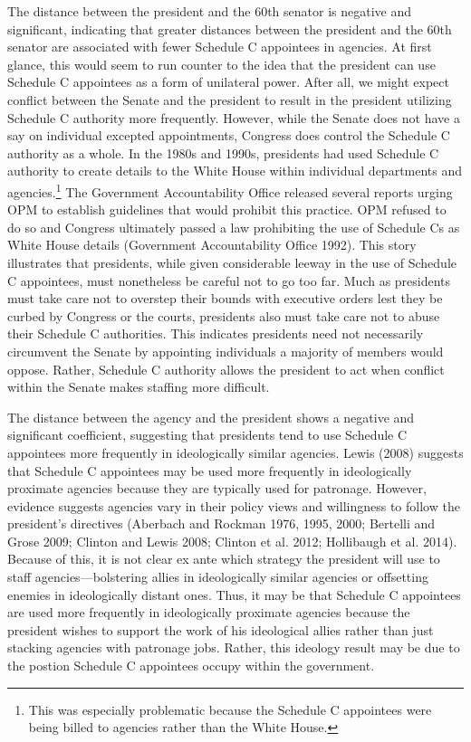 \documentclass[12pt]{article}
\begin{document}
The distance between the president and the 60th senator is negative and significant, indicating that greater distances between the president and the 60th senator are associated with fewer Schedule C appointees in agencies. At first glance, this would seem to run counter to the idea that the president can use Schedule C appointees as a form of unilateral power. After all, we might expect conflict between the Senate and the president to result in the president utilizing Schedule C authority more frequently. However, while the Senate does not have a say on individual excepted appointments, Congress does control the Schedule C authority as a whole. In the 1980s and 1990s, presidents had used Schedule C authority to create details to the White House within individual departments and agencies.\footnote{This was especially problematic because the Schedule C appointees were being billed to agencies rather than the White House.} The Government Accountability Office released several reports urging OPM to establish guidelines that would prohibit this practice. OPM refused to do so and Congress ultimately passed a law prohibiting the use of Schedule Cs as White House details (Government Accountability Office 1992). This story illustrates that presidents, while given considerable leeway in the use of Schedule C appointees, must nonetheless be careful not to go too far. Much as presidents must take care not to overstep their bounds with executive orders lest they be curbed by Congress or the courts, presidents also must take care not to abuse their Schedule C authorities. This indicates presidents need not necessarily circumvent the Senate by appointing individuals a majority of members would oppose. Rather, Schedule C authority allows the president to act when conflict within the Senate makes staffing more difficult.

The distance between the agency and the president shows a negative and significant coefficient, suggesting that presidents tend to use Schedule C appointees more frequently in ideologically similar agencies. Lewis (2008) suggests that Schedule C appointees may be used more frequently in ideologically proximate agencies because they are typically used for patronage. However, evidence suggests agencies vary in their policy views and willingness to follow the president's directives (Aberbach and Rockman 1976, 1995, 2000; Bertelli and Grose 2009; Clinton and Lewis 2008; Clinton et al. 2012; Hollibaugh et al. 2014). Because of this, it is not clear ex ante which strategy the president will use to staff agencies---bolstering allies in ideologically similar agencies or offsetting enemies in ideologically distant ones. Thus, it may be that Schedule C appointees are used more frequently in ideologically proximate agencies because the president wishes to support the work of his ideological allies rather than just stacking agencies with patronage jobs. Rather, this ideology result may be due to the postion Schedule C appointees occupy within the government.
\end{document}
